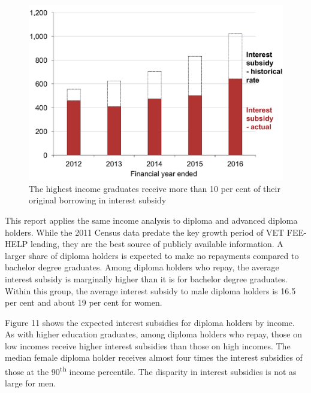 \documentclass[embargoed]{grattan}
\begin{document}
\begin{figure}
\caption{The highest income graduates receive more than 10 per cent of their original borrowing in interest subsidy}\label{fig:fig10-highest-income-grads-receive-over-10pc-original-borrowing-interest-subsidy}

\includegraphics[page=10]{atlas/Chartpack.pdf}

\end{figure}

\protect\hypertarget{_Ref312571851}{}{}This report applies the same income analysis to diploma and advanced diploma holders.
While the 2011 Census data predate the key growth period of VET FEE-HELP lending, they are the best source of publicly available information.
A larger share of diploma holders is expected to make no repayments compared to bachelor degree graduates.
Among diploma holders who repay, the average interest subsidy is marginally higher than it is for bachelor degree graduates.
Within this group, the average interest subsidy to male diploma holders is 16.5 per cent and about 19 per cent for women.

Figure 11 shows the expected interest subsidies for diploma holders by income.
As with higher education graduates, among diploma holders who repay, those on low incomes receive higher interest subsidies than those on high incomes.
The median female diploma holder receives almost four times the interest subsidies of those at the 90\textsuperscript{th} income percentile.
The disparity in interest subsidies is not as large for men.
\end{document}
